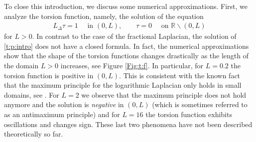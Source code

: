 \documentclass[10 pt]{article}
\numberwithin{equation}{section}
\def\R{\mathbb{R}}
\begin{document}
To close this introduction, we discuss some numerical approximations.  First, we analyze the torsion function, namely, the solution of the equation
\begin{align}\label{t:p:intro}
 L_\Delta \tau = 1\quad \text{ in }(0,L),\qquad \tau=0\quad \text{ on }\R\backslash (0,L)
\end{align}
for $L>0$.  In contrast to the case of the fractional Laplacian, the solution of \eqref{t:p:intro} does not have a closed formula. In fact, the numerical approximations show that the shape of the torsion functions changes drastically as the length of the domain $L>0$ increases, see Figure \ref{Fig:t:f}. In particular, for $L=0.2$ the torsion function is positive in $(0,L)$.  This is consistent with the known fact that the maximum principle for the logarithmic Laplacian only holds in small domains, see \cite[Corollary 1.9]{CW19}. For $L=2$ we observe that the maximum principle does not hold anymore and the solution is \emph{negative} in $(0,L)$ (which is sometimes referred to as an antimaximum principle) and for $L=16$ the torsion function exhibits oscillations and changes sign. These last two phenomena have not been described theoretically so far.
\end{document}
